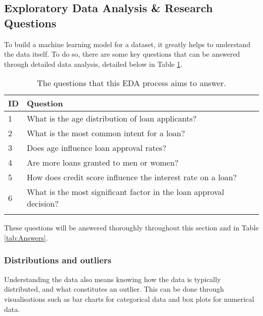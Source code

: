 \pagebreak

\subsection{Exploratory Data Analysis \& Research Questions}\label{subsec:EDA}
To build a machine learning model for a dataset, it greatly helps to understand the data itself. To do so, 
there are some key questions that can be answered through detailed data analysis, detailed below in Table \ref{tab:Questions}.

\begin{longtable}{ | p{} | p{} | }
    \hline
    \cellcolor{blue!25} ID & \cellcolor{blue!25} Question \\
    \hline
    1 & What is the age distribution of loan applicants? \\
    \hline
    2 & What is the most common intent for a loan? \\
    \hline
    3 & Does age influence loan approval rates? \\
    \hline 
    4 & Are more loans granted to men or women? \\
    \hline 
    5 & How does credit score influence the interest rate on a loan? \\
    \hline 
    6 & What is the most significant factor in the loan approval decision? \\
    \hline
    \caption{The questions that this EDA process aims to answer.}\label{tab:Questions}
\end{longtable}

\para These questions will be answered thoroughly throughout this section and in 
Table \ref{tab:Answers}.


\subsubsection{Distributions and outliers}
Understanding the data also means knowing how the data is typically distributed, and what constitutes an outlier. This can be 
done through visualisations such as bar charts for categorical data and box plots for numerical data.

